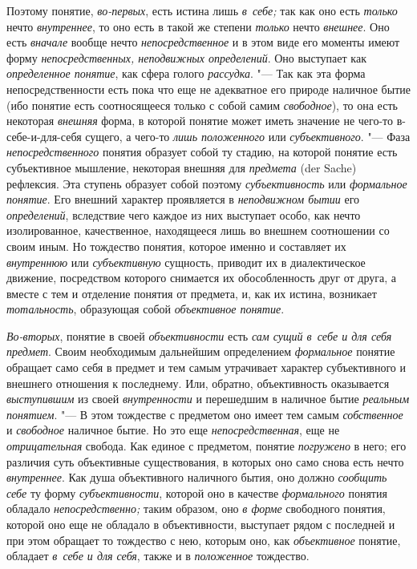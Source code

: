 Поэтому понятие, {\em во-первых}, есть истина лишь {\em в~себе;}
так как оно есть {\em только} нечто {\em внутреннее}, то оно
есть в такой же степени {\em только} нечто {\em внешнее}.
Оно есть {\em вначале} вообще нечто {\em непосредственное} и
в этом виде его моменты имеют форму {\em непосредственных, неподвижных
определений}. Оно выступает как {\em определенное понятие},
как сфера голого {\em рассудка}. "--- Так как
эта форма непосредственности есть пока что еще не адекватное его природе
наличное бытие (ибо понятие есть соотносящееся только с собой самим
{\em свободное}), то она есть некоторая {\em внешняя}
форма, в которой понятие может иметь значение не чего-то
в-себе-и-для-себя сущего, а чего-то {\em лишь положенного}
или {\em субъективного}. "--- Фаза {\em непосредственного}
понятия образует собой ту стадию, на которой понятие есть
субъективное мышление, некоторая внешняя для {\em предмета} (der Sache)
рефлексия. Эта ступень образует собой поэтому {\em субъективность} или
{\em формальное понятие}. Его внешний характер проявляется в
{\em неподвижном бытии} его {\em определений},
вследствие чего каждое из них выступает особо, как нечто
изолированное, качественное, находящееся лишь во внешнем соотношении со
своим иным. Но тождество понятия, которое именно и составляет их
{\em внутреннюю} или {\em субъективную}
сущность, приводит их в диалектическое движение, посредством
которого снимается их обособленность друг от друга, а вместе с тем и
отделение понятия от предмета, и, как их истина, возникает
{\em тотальность}, образующая собой {\em объективное понятие}.

{\em Во-вторых}, понятие в своей {\em объективности}
есть {\em сам сущий в~себе и для себя предмет}. Своим необходимым дальнейшим
определением {\em формальное}
понятие обращает само себя в предмет и тем самым утрачивает
характер субъективного и внешнего отношения к последнему. Или, обратно,
объективность оказывается {\em выступившим} из своей {\em внутренности}
и перешедшим в наличное бытие {\em реальным понятием}. "---
В этом тождестве с предметом оно имеет тем самым {\em собственное} и
{\em свободное} наличное бытие. Но это еще {\em непосредственная},
еще не {\em отрицательная} свобода. Как единое с предметом, понятие
{\em погружено} в него;
его различия суть объективные существования, в которых оно само снова есть
нечто {\em внутреннее}. Как душа объективного наличного бытия, оно должно
{\em сообщить себе} ту форму {\em субъективности}, которой оно в качестве
{\em формального} понятия обладало {\em непосредственно;} таким образом, оно
{\em в форме} свободного понятия, которой оно еще не обладало в
объективности, выступает рядом с последней и при этом обращает то тождество
с нею, которым оно, как {\em объективное} понятие, обладает
{\em в~себе и для себя}, также и в {\em положенное} тождество.

